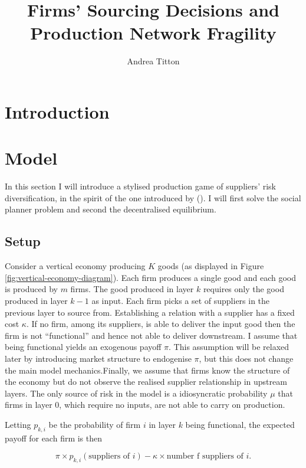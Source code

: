 \documentclass[american, abstract=on]{scrartcl}
\author{Andrea Titton}
\title{Firms' Sourcing Decisions and\\ Production Network Fragility}
\theoremstyle{plain}
\newcommand{\citein}[1]{\citeauthor{#1} (\citeyear{#1})}
\begin{document}
\maketitle
\section{Introduction}

\section{Model}

In this section I will introduce a stylised production game of suppliers' risk diversification, in the spirit of the one introduced by \citein{elliott_supply_2022}. I will first solve the social planner problem and second the decentralised equilibrium.

\subsection{Setup}

Consider a vertical economy producing $K$ goods (as displayed in Figure \ref{fig:vertical-economy-diagram}). Each firm produces a single good and each good is produced by $m$ firms. The good produced in layer $k$ requires only the good produced in layer $k - 1$ as input. Each firm picks a set of suppliers in the previous layer to source from. Establishing a relation with a supplier has a fixed cost $\kappa$. If no firm, among its suppliers, is able to deliver the input good then the firm is not ``functional'' and hence not able to deliver downstream. I assume that being functional yields an exogenous payoff $\pi$. This assumption will be relaxed later by introducing market structure to endogenise $\pi$, but this does not change the main model mechanics.Finally, we assume that firms know the structure of the economy but do not observe the realised supplier relationship in upstream layers. The only source of risk in the model is a idiosyncratic probability $\mu$ that firms in layer $0$, which require no inputs, are not able to carry on production.

Letting $p_{k, i}$ be the probability of firm $i$ in layer $k$ being functional, the expected payoff for each firm is then

\begin{equation}
  \pi \times p_{k, i}(\text{suppliers of }i) - \kappa \times \text{number f suppliers of }i.
\end{equation}
\end{document}
